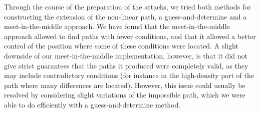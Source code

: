 Through the course of the preparation of the attacks, we tried both methods for constructing the extension of the non-linear path, \ie a guess-and-determine and a meet-in-the-middle approach.
We have found that the meet-in-the-middle approach allowed to find paths with fewer conditions, and that it allowed a better control of the position where some of these conditions were located.
A slight downside of our meet-in-the-middle implementation, however, is that it did not give strict guarantees that the paths it produced were completely valid, as they may include contradictory conditions
(for instance in the high-density part of the path where many differences are located). However, this issue could usually be resolved by considering slight variations of the impossible path, which
we were able to do efficiently with a guess-and-determine method.

\medskip

